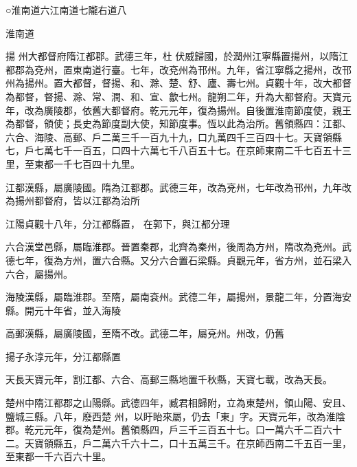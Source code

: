 
\begin{pinyinscope}

 ○淮南道六江南道七隴右道八



 淮南道



 揚
 州大都督府隋江都郡。武德三年，杜
 伏威歸國，於潤州江寧縣置揚州，以隋江都郡為兗州，置東南道行臺。七年，改兗州為邗州。九年，省江寧縣之揚州，改邗州為揚州。置大都督，督揚、和、滁、楚、舒、廬、壽七州。貞觀十年，改大都督為都督，督揚、滁、常、潤、和、宣、歙七州。龍朔二年，升為大都督府。天寶元年，改為廣陵郡，依舊大都督府。乾元元年，復為揚州。自後置淮南節度使，親王為都督，領使；長史為節度副大使，知節度事。恆以此為治所。舊領縣四：江都、六合、海陵、高郵、戶二萬三千一百九十九，口九萬四千三百四十七。天寶領縣七，戶七萬七千一百五，口四十六萬七千八百五十七。在京師東南二千七百五十三里，至東都一千七百四十九里。



 江都漢縣，屬廣陵國。隋為江都郡。武德三年，改為兗州，七年改為邗州，九年改為揚州都督府，皆以江都為治所



 江陽貞觀十八年，分江都縣置，
 在郭下，與江都分理



 六合漢堂邑縣，屬臨淮郡。晉置秦郡，北齊為秦州，後周為方州，隋改為兗州。武德七年，復為方州，置六合縣。又分六合置石梁縣。貞觀元年，省方州，並石梁入六合，屬揚州。



 海陵漢縣，屬臨淮郡。至隋，屬南袞州。武德二年，屬揚州，景龍二年，分置海安縣。開元十年省，並入海陵



 高郵漢縣，屬廣陵國，至隋不改。武德二年，屬兗州。州改，仍舊



 揚子永淳元年，分江都縣置



 天長天寶元年，割江都、六合、高郵三縣地置千秋縣，天寶七載，改為天長。



 楚州中隋江都郡之山陽縣。武德四年，臧君相歸附，立為東楚州，領山陽、安且、鹽城三縣。八年，廢西楚
 州，以盱眙來屬，仍去「東」字。天寶元年，改為淮陰郡。乾元元年，復為楚州。舊領縣四，戶三千三百五十七。口一萬六千二百六十二。天寶領縣五，戶二萬六千六十二，口十五萬三千。在京師西南二千五百一里，至東都一千六百六十里。




\end{pinyinscope}
